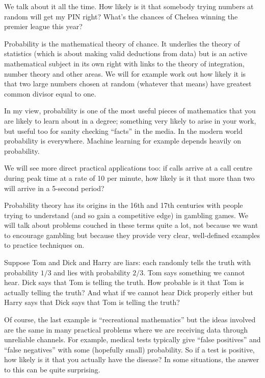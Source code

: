 




We talk about it all the time. How likely is it that somebody trying numbers at random will get my PIN right?   What's the chances of Chelsea winning the premier league this year?  

Probability is the mathematical theory of chance. It underlies the theory of statistics (which is about making valid deductions from data) but is an active mathematical subject in its own right with links to the theory of integration, number theory and other areas. We will for example work out how likely it is that two large numbers chosen at random (whatever that means) have greatest common divisor equal to one. 

In my view, probability is one of the most useful pieces of mathematics that you are likely to learn about in a degree; something very likely to arise in your work, but useful too for sanity checking ``facts'' in the media.  In the modern world probability is everywhere. Machine learning for example depends heavily on probability. 

We will see more direct practical applications too: if calls arrive at a call centre during peak time at a rate of 10 per minute, how likely is it that more than two will arrive in a 5-second period?  

Probability theory has its origins in the 16th and 17th centuries with people trying to understand (and so gain a competitive edge) in gambling games. We will talk about problems couched in these terms quite a lot, not because we want to encourage gambling but because they provide very clear, well-defined examples to practice techniques on. 

 Suppose Tom and Dick and Harry are liars: each randomly tells the truth with probability $1/3$ and lies with probability $2/3$. Tom says something we cannot hear. Dick says that Tom is telling the truth.  How probable is it that Tom is actually telling the truth?   And what if we cannot hear Dick properly either but Harry says that Dick says that Tom is telling the truth?   
 
 Of course, the last example is  ``recreational mathematics'' but the ideas involved are the same in many practical problems where we are receiving data through unreliable channels. For example, medical tests typically give ``false positives'' and ``false negatives'' with some (hopefully small) probability. So if a test is positive, how likely is it that you actually have the disease?  In some situations, the answer to this can be quite surprising. 







